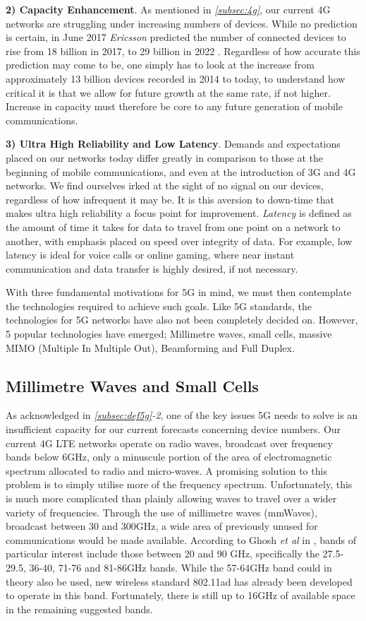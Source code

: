 \documentclass[journal]{IEEEtran}
\begin{document}
\textbf{2) Capacity Enhancement}. As mentioned in \textit{\ref{subsec:4g}}, our current 4G networks are struggling under increasing numbers of devices. While no prediction is certain, in June 2017 \textit{Ericsson} predicted the number of connected devices to rise from 18 billion in 2017, to 29 billion in 2022 \cite{ericssondev}. Regardless of how accurate this prediction may come to be, one simply has to look at the increase from approximately 13 billion devices recorded in 2014 \cite{ericssondev} to today, to understand how critical it is that we allow for future growth at the same rate, if not higher. Increase in capacity must therefore be core to any future generation of mobile communications.

\textbf{3) Ultra High Reliability and Low Latency}. Demands and expectations placed on our networks today differ greatly in comparison to those at the beginning of mobile communications, and even at the introduction of 3G and 4G networks. We find ourselves irked at the sight of no signal on our devices, regardless of how infrequent it may be. It is this aversion to down-time that makes ultra high reliability a focus point for improvement. \textit{Latency} is defined as the amount of time it takes for data to travel from one point on a network to another, with emphasis placed on speed over integrity of data. For example, low latency is ideal for voice calls or online gaming, where near instant communication and data transfer is highly desired, if not necessary.

With three fundamental motivations for 5G in mind, we must then contemplate the technologies required to achieve such goals. Like 5G standards, the technologies for 5G networks have also not been completely decided on. However, 5 popular technologies have emerged; Millimetre waves, small cells, massive MIMO (Multiple In Multiple Out), Beamforming and Full Duplex.

\subsection{Millimetre Waves and Small Cells}
As acknowledged in \textit{\ref{subsec:def5g}-2}, one of the key issues 5G needs to solve is an insufficient capacity for our current forecasts concerning device numbers. Our current 4G LTE networks operate on radio waves, broadcast over frequency bands below 6GHz, only a minuscule portion of the area of electromagnetic spectrum allocated to radio and micro-waves. A promising solution to this problem is to simply utilise more of the frequency spectrum. Unfortunately, this is much more complicated than plainly allowing waves to travel over a wider variety of frequencies. Through the use of millimetre waves (mmWaves), broadcast between 30 and 300GHz, a wide area of previously unused for communications would be made available. According to Ghosh \textit{et al} in \cite{mmwave}, bands of particular interest include those between 20 and 90 GHz, specifically the 27.5-29.5, 36-40, 71-76 and 81-86GHz bands. While the 57-64GHz band could in theory also be used, new wireless standard 802.11ad has already been developed to operate in this band. Fortunately, there is still up to 16GHz of available space in the remaining suggested bands.
\end{document}
